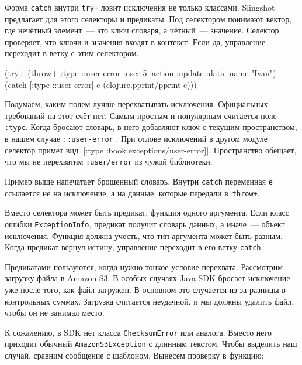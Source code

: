 
Форма \verb|catch| внутри \verb|try+| ловит исключения не только
классами. Slingshot предлагает для этого селекторы и предикаты. Под селектором
понимают вектор, где нечётный элемент~--- это ключ словаря, а чётный~---
значение. Селектор проверяет, что ключи и значения входят в контекст. Если да,
управление переходит в ветку с этим селектором.

\begin{english}
  \begin{clojure/lines}
(try+
 (throw+ {:type ::user-error
          :user 5
          :action :update
          :data {:name "Ivan"}})
 (catch [:type ::user-error] e
   (clojure.pprint/pprint e)))
  \end{clojure/lines}
\end{english}

Подумаем, каким полем лучше перехватывать исключения. Официальных требований на
этот счёт нет. Самым простым и популярным считается поле \verb|:type|. Когда
бросают словарь, в него добавляют ключ с текущим пространством, в нашем случае
\verb|::user-error| . При отлове исключений в другом модуле селектор
примет вид \spverb|[:type :book.exceptions/user-error]|. Пространство обещает,
что мы не перехватим \texttt{:user\-/error} из чужой библиотеки.

Пример выше напечатает брошенный словарь. Внутри \verb|catch| переменная
\verb|e| ссылается не на исключение, а на данные, которые передали
в~\verb|throw+|.

Вместо селектора может быть предикат, функция одного аргумента. Если класс
ошибки \texttt{Excep\-tion\-Info}, предикат получит словарь данных, а иначе~--- объект
исключения. Функция должна учесть, что тип аргумента может быть разным. Когда
предикат вернул истину, управление переходит в его ветку \verb|catch|.


Предикатами пользуются, когда нужно тонкое условие перехвата. Рассмотрим
загрузку файла в Amazon S3. В особых случаях Java SDK бросает исключение уже
после того, как файл загружен. В основном это случается из-за разницы в
контрольных суммах. Загрузка считается неудачной, и мы должны удалить файл,
чтобы он не занимал место.

К сожалению, в SDK нет класса \texttt{Check\-sum\-Er\-ror} или аналога. Вместо него
приходит обычный \texttt{Ama\-zon\-S3\-Excep\-tion} с длинным текстом. Чтобы выделить
наш случай, сравним сообщение с шаблоном. Вынесем проверку в функцию:


